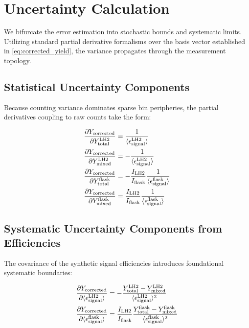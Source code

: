 \documentclass[11pt]{article}
\begin{document}
\section{Uncertainty Calculation}
\label{sec:error_calc}

We bifurcate the error estimation into stochastic bounds and systematic limits. Utilizing standard partial derivative formalisms over the basis vector established in \cref{eq:corrected_yield}, the variance propagates through the measurement topology.

\subsection*{Statistical Uncertainty Components}
Because counting variance dominates sparse bin peripheries, the partial derivatives coupling to raw counts take the form:

\begin{align}
\frac{\partial Y_{\rm corrected}}{\partial Y^{\textrm{LH2}}_{\textrm{total}} } &= \frac{1}{\langle\epsilon^{\textrm{LH2}}_{\textrm{signal}}\rangle} \\
\frac{\partial Y_{\rm corrected}}{\partial Y^{\textrm{LH2}}_{\textrm{mixed}} } &= -\frac{1}{\langle\epsilon^{\textrm{LH2}}_{\textrm{signal}}\rangle} \\
\frac{\partial Y_{\rm corrected}}{\partial Y^{\textrm{flask}}_{\textrm{total}} } &= - \frac{I_{\textrm{LH2}}}{I_{\textrm{flask}}} \frac{1}{\langle\epsilon^{\textrm{flask}}_{\textrm{signal}}\rangle} \\
\frac{\partial Y_{\rm corrected}}{\partial Y^{\textrm{flask}}_{\textrm{mixed}} } &= \frac{I_{\textrm{LH2}}}{I_{\textrm{flask}}} \frac{1}{\langle\epsilon^{\textrm{flask}}_{\textrm{signal}}\rangle}
\end{align}

\subsection*{Systematic Uncertainty Components from Efficiencies}
The covariance of the synthetic signal efficiencies introduces foundational systematic boundaries:

\begin{align}
\frac{\partial Y_{\rm corrected}}{\partial \langle\epsilon^{\textrm{LH2}}_{\textrm{signal}}\rangle} &= -\frac{Y^{\textrm{LH2}}_{\textrm{total}} - Y^{\textrm{LH2}}_{\textrm{mixed}}}{\langle\epsilon^{\textrm{LH2}}_{\textrm{signal}}\rangle^2} \\
\frac{\partial Y_{\rm corrected}}{\partial \langle\epsilon^{\textrm{flask}}_{\textrm{signal}}\rangle} &= \frac{I_{\textrm{LH2}}}{I_{\textrm{flask}}} \frac{Y^{\textrm{flask}}_{\textrm{total}} - Y^{\textrm{flask}}_{\textrm{mixed}}}{\langle\epsilon^{\textrm{flask}}_{\textrm{signal}}\rangle^2}
\end{align}
\end{document}
